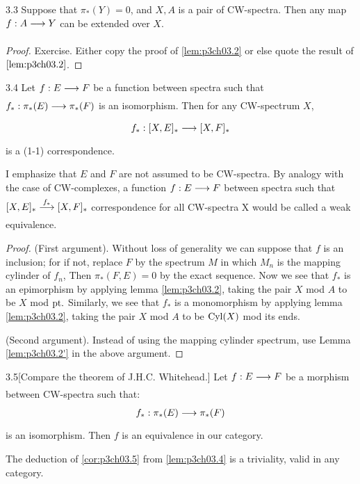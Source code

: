 \documentclass[../main]{subfiles}
\begin{document}
\begin{customlemma}{3.3} \label{lem:p3ch03.3}
Suppose that $\pi_\ast(Y)=0$, and $X,A$ is a pair of CW-spectra. Then any map $f:A\lar{}Y$ can be extended over $X$.
\end{customlemma}
\begin{proof}
Exercise. Either copy the proof of \ref{lem:p3ch03.2} or else quote the result of $\ref{lem:p3ch03.2}$.
\end{proof}

\begin{customthm}{3.4}\label{lem:p3ch03.4}
Let $f:E\lar{}F$ be a function between spectra such that $f_\ast:\pi_\ast(E)\lar{} \pi_\ast(F)$ is an isomorphism. Then for any CW-spectrum $X$, \[f_\ast:[X,E]_\ast \lar{}[X,F]_\ast\] is a (1-1) correspondence.
\end{customthm}
I emphasize that $E$ and $F$ are not assumed to be CW-spectra.
By analogy with the case of CW-complexes, a function $f: E\lar{} F$
between spectra such that $ [X,E]_\ast \lar{f_\ast}[X,F]_\ast$ correspondence
for all CW-spectra X would be called a weak equivalence. 

\begin{proof}
(First argument). Without loss of generality we
can suppose that $f$ is an inclusion; for if not, replace $F$ by the
spectrum $M$ in which $M_n$ is the mapping cylinder of $f_n$, Then
$\pi_\ast(F,E) = 0$ by the exact sequence. Now we see that $f_\ast$ is an epimorphism by applying lemma \ref{lem:p3ch03.2}, taking the pair $X$ mod $A$ to be $X$ mod $\mathrm{pt.}$
Similarly, we see that $f_\ast$ is a monomorphism by applying lemma \ref{lem:p3ch03.2}, taking the pair $X$ mod $A$ to be $\mathrm{Cyl}(X)$ mod its ends.

(Second argument). Instead of using the mapping cylinder spectrum,
use Lemma \ref{lem:p3ch03.2'} in the above argument. 
\end{proof}

\begin{customcor}{3.5}[Compare the theorem of J.H.C. Whitehead.] \label{cor:p3ch03.5} Let $f:E\lar{}F$ be a morphism between CW-spectra such that:
\[f_\ast:\pi_\ast(E)\lar{} \pi_\ast(F)\]
is an isomorphism. Then $f$ is an equivalence in our category. 
\end{customcor}
The deduction of \ref{cor:p3ch03.5} from \ref{lem:p3ch03.4} is a triviality, valid in any category. 
\end{document}
